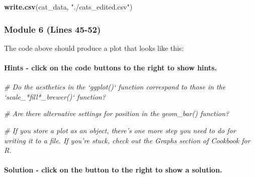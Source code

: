 \documentclass[
]{article}
\newenvironment{Shaded}{\begin{snugshade}}{\end{snugshade}}
\newcommand{\CommentTok}[1]{\textcolor[rgb]{0.56,0.35,0.01}{\textit{#1}}}
\newcommand{\KeywordTok}[1]{\textcolor[rgb]{0.13,0.29,0.53}{\textbf{#1}}}
\newcommand{\NormalTok}[1]{#1}
\newcommand{\StringTok}[1]{\textcolor[rgb]{0.31,0.60,0.02}{#1}}
\begin{document}
\begin{Shaded}
\begin{Highlighting}[]
\KeywordTok{write.csv}\NormalTok{(cat_data, }\StringTok{"./cats_edited.csv"}\NormalTok{)}
\end{Highlighting}
\end{Shaded}

\hypertarget{module-6-lines-45-52}{%
\subsubsection{Module 6 (Lines 45-52)}\label{module-6-lines-45-52}}

The code above should produce a plot that looks like this:

\hypertarget{hints---click-on-the-code-buttons-to-the-right-to-show-hints.-3}{%
\paragraph{Hints - click on the code buttons to the right to show
hints.}\label{hints---click-on-the-code-buttons-to-the-right-to-show-hints.-3}}

\begin{Shaded}
\begin{Highlighting}[]
\CommentTok{# Do the aesthetics in the `ggplot()` function correspond to those in the `scale_*fill*_brewer()` function?}
\end{Highlighting}
\end{Shaded}

\begin{Shaded}
\begin{Highlighting}[]
\CommentTok{# Are there alternative settings for position in the geom_bar() function?}
\end{Highlighting}
\end{Shaded}

\begin{Shaded}
\begin{Highlighting}[]
\CommentTok{# If you store a plot as an object, there's one more step you need to do for writing it to a file. If you're stuck, check out the Graphs section of Cookbook for R.}
\end{Highlighting}
\end{Shaded}

\hypertarget{solution---click-on-the-button-to-the-right-to-show-a-solution.}{%
\paragraph{Solution - click on the button to the right to show a
solution.}\label{solution---click-on-the-button-to-the-right-to-show-a-solution.}}
\end{document}
